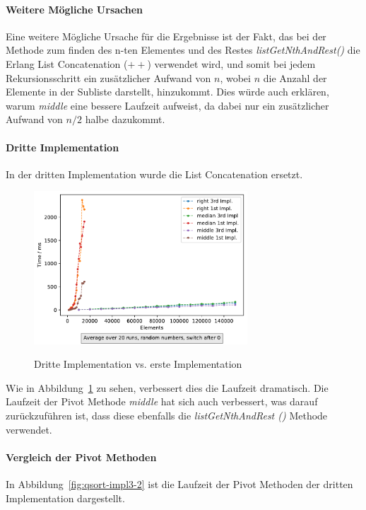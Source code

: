 \paragraph{Weitere Mögliche Ursachen}
Eine weitere Mögliche Ursache für die Ergebnisse ist der Fakt, das bei der
Methode zum finden des n-ten Elementes und des Restes
\textit{listGetNthAndRest()} die Erlang List Concatenation (\(++\)) verwendet
wird, und somit bei jedem Rekursionsschritt ein zusätzlicher Aufwand von
\(n\), wobei \(n\) die Anzahl der Elemente in der Subliste darstellt,
hinzukommt.
Dies würde auch erklären, warum \textit{middle} eine bessere Laufzeit
aufweist, da dabei nur ein zusätzlicher Aufwand von \(n/2\) halbe dazukommt.

\paragraph{Dritte Implementation}
In der dritten Implementation wurde die List Concatenation ersetzt.

\begin{figure}[hbt]
    \centering
    \caption{Dritte Implementation vs. erste Implementation}
    \includegraphics[width=8cm]
    {../out/pivotMethods_Implementation3.pdf}\label{fig:qsort-impl3}
\end{figure}

Wie in Abbildung~\ref{fig:qsort-impl3} zu sehen,
verbessert dies die Laufzeit dramatisch.
Die Laufzeit der Pivot Methode \textit{middle} hat sich auch verbessert, was
darauf zurückzuführen ist, dass diese ebenfalls die \textit{listGetNthAndRest
()} Methode verwendet.

\paragraph{Vergleich der Pivot Methoden}

In Abbildung~\ref{fig:qsort-impl3-2} ist die Laufzeit der Pivot Methoden der
dritten Implementation dargestellt.

